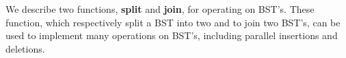 We describe two functions, \textbf{split} and \textbf{join}, for
operating on BST's.  These function, which respectively split a BST
into two and to join two BST's, can be used to implement many
operations on BST's, including parallel insertions and deletions.



\begin{comment}
We are interested in two functions, called \cname{split}
and \cname{join}, with the following types:
\begin{lstlisting}[numbers=none]
  split$(T,k)$ : BST ** $\kkk$ -> BST ** $\bbb$ ** BST@\vspace{.1in}@
  join$(T_1,m,T_2)$ : BST ** ($\kkk$ option) ** BST -> BST 
\end{lstlisting}
where $\bbb$, as usual, indicates a Boolean.
\end{comment}

